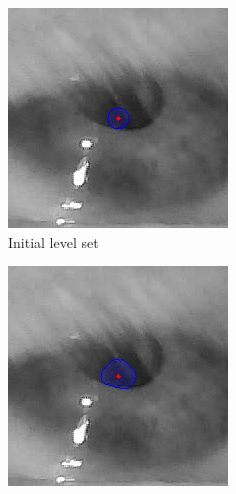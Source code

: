 \begin{figure}[h]
    \centering
    \begin{subfigure}{0.3\textwidth}
        \centering
        \includegraphics[width=0.9\linewidth]{plots/acwe/iteration_0.png}
        \caption{Initial level set}
    \end{subfigure}%
    \hfill
    \begin{subfigure}{0.3\textwidth}
        \centering
        \includegraphics[width=0.9\linewidth]{plots/acwe/iteration_7.png}

\end{subfigure}
\end{figure}
